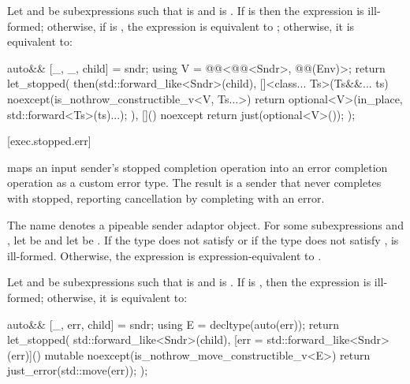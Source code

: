 \pnum
Let  and  be subexpressions
such that  is  and
 is .
If 
is 
then the expression 
is ill-formed;
otherwise,
if 
is ,
the expression 
is equivalent to ;
otherwise, it is equivalent to:
\begin{codeblock}
auto&& [_, _, child] = sndr;
using V = @@<@@<Sndr>, @@(Env)>;
return let_stopped(
  then(std::forward_like<Sndr>(child),
       []<class... Ts>(Ts&&... ts) noexcept(is_nothrow_constructible_v<V, Ts...>) {
         return optional<V>(in_place, std::forward<Ts>(ts)...);
       }),
  []() noexcept { return just(optional<V>()); });
\end{codeblock}

[exec.stopped.err]{}

\pnum
{} maps an input sender's stopped completion operation
into an error completion operation as a custom error type.
The result is a sender that never completes with stopped,
reporting cancellation by completing with an error.

\pnum
The name  denotes a pipeable sender adaptor object.
For some subexpressions  and ,
let  be  and
let  be .
If the type  does not satisfy  or
if the type  does not satisfy ,
 is ill-formed.
Otherwise, the expression 
is expression-equivalent to
.

\pnum
Let  and  be subexpressions
such that  is  and
 is .
If  is ,
then the expression 
is ill-formed;
otherwise, it is equivalent to:
\begin{codeblock}
auto&& [_, err, child] = sndr;
using E = decltype(auto(err));
return let_stopped(
  std::forward_like<Sndr>(child),
  [err = std::forward_like<Sndr>(err)]() mutable noexcept(is_nothrow_move_constructible_v<E>) {
    return just_error(std::move(err));
  });
\end{codeblock}

